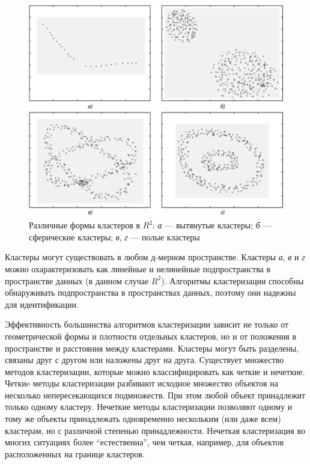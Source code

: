 \begin{figure}[H]
	\centering
	\includegraphics[width=\textwidth]{img/clusters.pdf}
	\caption{Различные формы кластеров в $R^{2}$: \textit{а} — вытянутые кластеры; \textit{б} — сферические кластеры; \textit{в}, \textit{г} — полые кластеры}
	\label{clusters}
\end{figure}  

Кластеры могут существовать в любом д-мерном пространстве.
Кластеры \textit{а}, \textit{в} и \textit{г} можно охарактеризовать как линейные и нелинейные
подпространства в пространстве данных (в данном случае $R^{2}$). Алгоритмы
кластеризации способны обнаруживать подпространства в пространствах
данных, поэтому они надежны для идентификации. \cite{ClustMethods}

Эффективность большинства алгоритмов кластеризации зависит не
только от геометрической формы и плотности отдельных кластеров, но и от
положения в пространстве и расстояния между кластерами. Кластеры могут
быть разделены, связаны друг с другом или наложены друг на друга.
Существует множество методов кластеризации, которые можно
классифицировать как четкие и нечеткие. Четкиe методы кластеризации
разбивают исходное множество объектов на несколько непересекающихся
подмножеств. При этом любой объект принадлежит только одному кластеру.
Нечеткие методы кластеризации позволяют одному и тому же объекты
принадлежать одновременно нескольким (или даже всем) кластерам, но с
различной степенью принадлежности. Нечеткая кластеризация во многих
ситуациях более “естественна”, чем четкая, например, для объектов
расположенных на границе кластеров. \cite{FuzzyClust}

